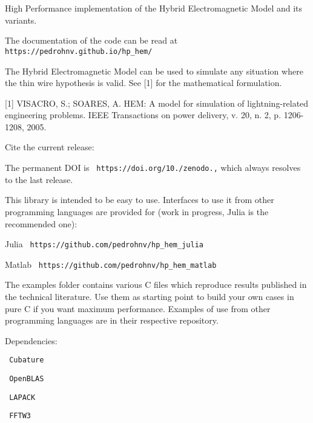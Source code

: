 High Performance implementation of the Hybrid Electromagnetic Model and its variants.

The documentation of the code can be read at {\texttt{ https\+://pedrohnv.\+github.\+io/hp\+\_\+hem/}}

The Hybrid Electromagnetic Model can be used to simulate any situation where the thin wire hypothesis is valid. See [1] for the mathematical formulation.

[1] V\+I\+S\+A\+C\+RO, S.; S\+O\+A\+R\+ES, A. H\+EM\+: A model for simulation of lightning-\/related engineering problems. I\+E\+EE Transactions on power delivery, v. 20, n. 2, p. 1206-\/1208, 2005.

Cite the current release\+: {\texttt{ }}

The permanent D\+OI is {\texttt{ https\+://doi.\+org/10./zenodo.,}} which always resolves to the last release.

This library is intended to be easy to use. Interfaces to use it from other programming languages are provided for (work in progress, Julia is the recommended one)\+:


\begin{DoxyItemize}
\item Julia {\texttt{ https\+://github.\+com/pedrohnv/hp\+\_\+hem\+\_\+julia}}
\item Matlab {\texttt{ https\+://github.\+com/pedrohnv/hp\+\_\+hem\+\_\+matlab}}
\end{DoxyItemize}

The {\ttfamily examples} folder contains various C files which reproduce results published in the technical literature. Use them as starting point to build your own cases in pure C if you want maximum performance. Examples of use from other programming languages are in their respective repository.

Dependencies\+:
\begin{DoxyItemize}
\item {\texttt{ Cubature}}
\item {\texttt{ Open\+B\+L\+AS}}
\item {\texttt{ L\+A\+P\+A\+CK}}
\item {\texttt{ F\+F\+T\+W3}} 
\end{DoxyItemize}